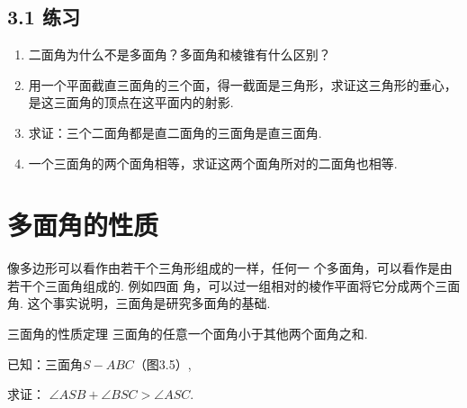 \subsection*{3.1 练习}
\begin{enumerate}
    \item 二面角为什么不是多面角？多面角和棱锥有什么区别？
    \item 
用一个平面截直三面角的三个面，得一截面是三角形，求证这三角形的垂心，是这三面角的顶点在这平面内的射影.
    \item 
求证：三个二面角都是直二面角的三面角是直三面角.
    \item 
一个三面角的两个面角相等，求证这两个面角所对的二面角也相等.
\end{enumerate}


\section{多面角的性质}

像多边形可以看作由若干个三角形组成的一样，任何一
个多面角，可以看作是由若干个三面角组成的. 例如四面
角，可以过一组相对的棱作平面将它分成两个三面角. 这个事实说明，三面角是研究多面角的基础.

\begin{thm}
{三面角的性质定理} 三面角的任意一个面角小于其他两个面角之和.
\end{thm}


已知：三面角$S-ABC$（图3.5）,

求证： $\angle ASB+\angle BSC>\angle ASC$.

\begin{figure}[htp]
    \centering
{}
    \caption{}
\end{figure}

